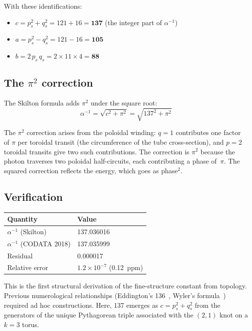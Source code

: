 \documentclass[11pt,a4paper]{article}
\begin{document}
With these identifications:
\begin{itemize}
  \item $c = p_s^2 + q_s^2 = 121 + 16 = \mathbf{137}$ (the integer part of $\alpha^{-1}$)
  \item $a = p_s^2 - q_s^2 = 121 - 16 = \mathbf{105}$
  \item $b = 2\,p_s\,q_s = 2 \times 11 \times 4 = \mathbf{88}$
\end{itemize}

\subsection{The $\pi^2$ correction}

The Skilton formula adds $\pi^2$ under the square root:
\begin{equation}
  \alpha^{-1} = \sqrt{c^2 + \pi^2} = \sqrt{137^2 + \pi^2}
\end{equation}

The $\pi^2$ correction arises from the poloidal winding: $q = 1$ contributes one factor of $\pi$ per toroidal transit (the circumference of the tube cross-section), and $p = 2$ toroidal transits give two such contributions. The correction is $\pi^2$ because the photon traverses two poloidal half-circuits, each contributing a phase of~$\pi$. The squared correction reflects the energy, which goes as phase$^2$.

\subsection{Verification}

\begin{table}[h]
\centering
\begin{tabular}{@{}ll@{}}
\toprule
Quantity & Value \\
\midrule
$\alpha^{-1}$ (Skilton) & 137.036016 \\
$\alpha^{-1}$ (CODATA 2018) & 137.035999 \\
Residual & 0.000017 \\
Relative error & $1.2 \times 10^{-7}$ (0.12~ppm) \\
\bottomrule
\end{tabular}
\end{table}

This is the first structural derivation of the fine-structure constant from topology. Previous numerological relationships (Eddington's 136~\cite{eddington1929}, Wyler's formula~\cite{wyler1969}) required ad hoc constructions. Here, 137 emerges as $c = p_s^2 + q_s^2$ from the generators of the unique Pythagorean triple associated with the $(2,1)$ knot on a $k=3$ torus.
\end{document}
